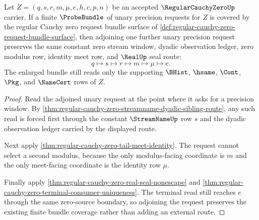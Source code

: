\begin{theorem}
\label{thm:regular-cauchy-zero-probebundle-cons-window}
Let $Z=(q,s,r,m,\mu,e,h,c,p,n)$ be an accepted $\RegularCauchyZeroUp$ carrier. If a finite $\ProbeBundle$ of unary precision requests for $Z$ is covered by the regular Cauchy zero request bundle surface of \autoref{def:regular-cauchy-zero-request-bundle-surface}, then adjoining one further unary precision request preserves the same constant zero stream window, dyadic observation ledger, zero modulus row, identity meet row, and $\RealUp$ seal route:
$$
q \mapsto s \mapsto r \mapsto m \mapsto \mu \mapsto e.
$$
The enlarged bundle still reads only the supporting $\BHist$, $\hsame$, $\Cont$, $\Pkg$, and $\NameCert$ rows of $Z$.
\end{theorem}
\begin{proof}
Read the adjoined unary request at the point where it asks for a precision window. By \autoref{thm:regular-cauchy-zero-streamname-dyadic-sibling-route}, any such read is forced first through the constant $\StreamNameUp$ row $s$ and the dyadic observation ledger carried by the displayed route.

Next apply \autoref{thm:regular-cauchy-zero-tail-meet-identity}. The request cannot select a second modulus, because the only modulus-facing coordinate is $m$ and the only meet-facing coordinate is the identity row $\mu$.

Finally apply \autoref{thm:regular-cauchy-zero-real-seal-nonescape} and \autoref{thm:regular-cauchy-zero-terminal-consumer-uniqueness}. The terminal read still reaches $e$ through the same zero-source boundary, so adjoining the request preserves the existing finite bundle coverage rather than adding an external route.
\end{proof}

